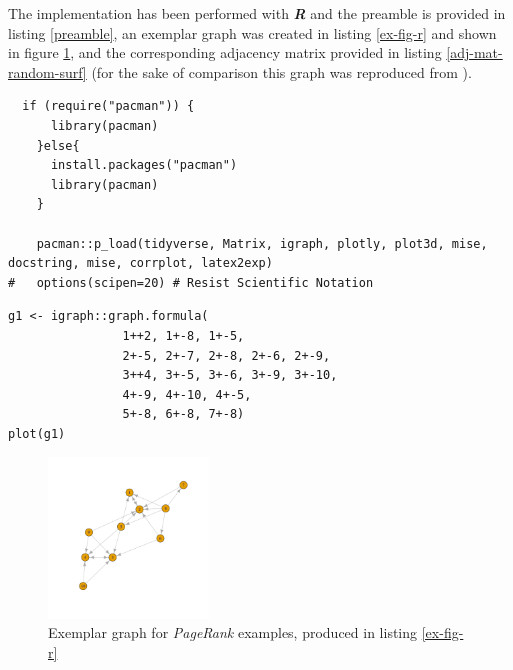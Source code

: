 \documentclass[11pt]{report}
\begin{document}
The implementation has been performed with \emph{\textbf{R}} and the preamble is
provided in listing \ref{preamble}, an exemplar graph was created in listing \ref{ex-fig-r} and shown in figure \ref{example-rs-graph}, and the corresponding adjacency matrix provided in listing \ref{adj-mat-random-surf} (for the sake of comparison this graph was reproduced from \cite{parkPowerWalkRevisiting2013}).




\begin{listing}[htbp]
\begin{tcolorbox}
\begin{verbatim}
  if (require("pacman")) {
      library(pacman)
    }else{
      install.packages("pacman")
      library(pacman)
    }

    pacman::p_load(tidyverse, Matrix, igraph, plotly, plot3d, mise, docstring, mise, corrplot, latex2exp)
#   options(scipen=20) # Resist Scientific Notation
\end{verbatim}
\caption{\label{preamble}Implemented Packages used in this report}
\end{tcolorbox}
\end{listing}


\begin{listing}[htbp]
\begin{tcolorbox}
\begin{verbatim}
g1 <- igraph::graph.formula(
                1++2, 1+-8, 1+-5,
                2+-5, 2+-7, 2+-8, 2+-6, 2+-9,
                3++4, 3+-5, 3+-6, 3+-9, 3+-10,
                4+-9, 4+-10, 4+-5,
                5+-8, 6+-8, 7+-8)
plot(g1)
\end{verbatim}
\caption{\label{ex-fig-r}Produce exemplar graph in figure \ref{example-rs-graph}}
\end{tcolorbox}
\end{listing}


\begin{figure}
\begin{center}
\includegraphics[width=0.38\textwidth]{media/example-graph-power-walk.png}
\end{center}
\caption{\label{example-rs-graph}Exemplar graph for \emph{PageRank} examples, produced in listing \ref{ex-fig-r}}
\end{figure}
\end{document}
